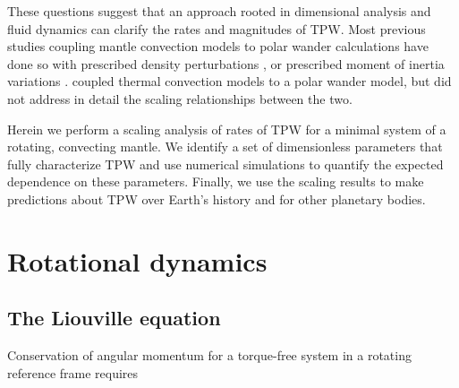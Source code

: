 \documentclass[preprint,12pt,authoryear]{elsarticle}
\begin{document}
These questions suggest that an approach rooted in dimensional analysis and fluid dynamics can clarify the rates and magnitudes of TPW.
Most previous studies coupling mantle convection models to polar wander calculations have done so with prescribed density perturbations \citep[e.g.][]{greff2004upwelling}, or prescribed moment of inertia variations \citep[e.g.][]{tsai2007theoretical, creveling2012mechanisms}. 
\citet{richards1999polar} coupled thermal convection models to a polar wander model, but did not address in detail the scaling relationships between the two.

Herein we perform a scaling analysis of rates of TPW for a minimal system of a rotating, convecting mantle. We identify a set of dimensionless parameters that fully characterize TPW and use numerical simulations to quantify the expected dependence on these parameters. Finally, we use the scaling results to make predictions about TPW over Earth's history and for other planetary bodies. 

\section{Rotational dynamics}
\label{sec:rotational_dynamics}

\subsection{The Liouville equation}
\label{sec:liouville}
Conservation of angular momentum for a torque-free system in a rotating reference frame requires
\end{document}
